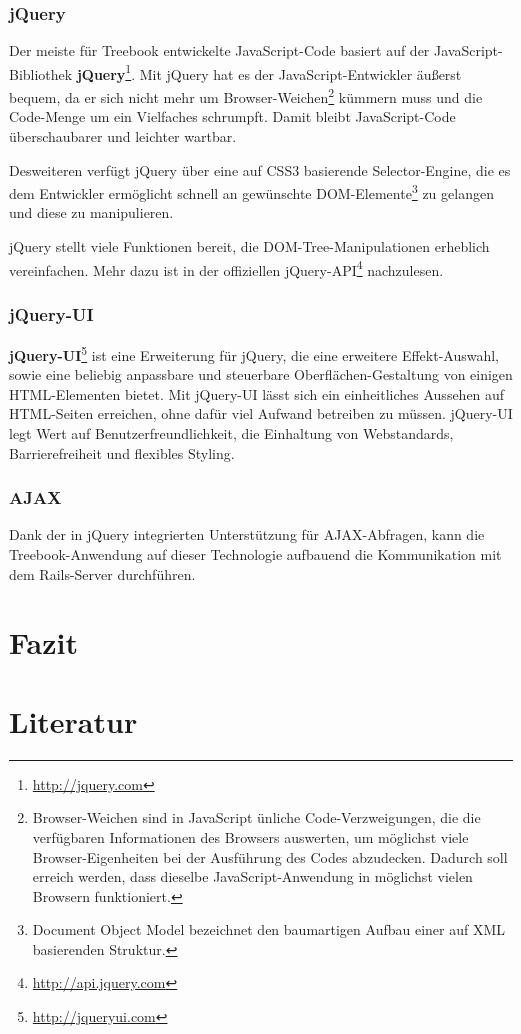 \documentclass[10pt,a4paper]{book}
\begin{document}
\subsection{jQuery}
Der meiste für Treebook entwickelte JavaScript-Code basiert auf der JavaScript-Bibliothek \textbf{jQuery}\footnote{\href{http://jquery.com}{http://jquery.com}}. Mit jQuery hat es der JavaScript-Entwickler äußerst bequem, da er sich nicht mehr um Browser-Weichen\footnote{Browser-Weichen sind in JavaScript ünliche Code-Verzweigungen, die die verfügbaren Informationen des Browsers auswerten, um möglichst viele Browser-Eigenheiten bei der Ausführung des Codes abzudecken. Dadurch soll erreich werden, dass dieselbe JavaScript-Anwendung in möglichst vielen Browsern funktioniert.} kümmern muss und die Code-Menge um ein Vielfaches schrumpft. Damit bleibt JavaScript-Code überschaubarer und leichter wartbar.

Desweiteren verfügt jQuery über eine auf CSS3 basierende Selector-Engine, die es dem Entwickler ermöglicht schnell an gewünschte DOM-Elemente\footnote{Document Object Model bezeichnet den baumartigen Aufbau einer auf XML basierenden Struktur.} zu gelangen und diese zu manipulieren.

jQuery stellt viele Funktionen bereit, die DOM-Tree-Manipulationen erheblich vereinfachen. Mehr dazu ist in der offiziellen jQuery-API\footnote{\href{http://api.jquery.com}{http://api.jquery.com}} nachzulesen.

\subsection{jQuery-UI}
\textbf{jQuery-UI}\footnote{\href{http://jqueryui.com}{http://jqueryui.com}} ist eine Erweiterung für jQuery, die eine erweitere Effekt-Auswahl, sowie eine beliebig anpassbare und steuerbare Oberflächen-Gestaltung von einigen HTML-Elementen bietet.
Mit jQuery-UI lässt sich ein einheitliches Aussehen auf HTML-Seiten erreichen, ohne dafür viel Aufwand betreiben zu müssen. jQuery-UI legt Wert auf Benutzerfreundlichkeit, die Einhaltung von Webstandards, Barrierefreiheit und flexibles Styling.

\subsection{AJAX}
Dank der in jQuery integrierten Unterstützung für AJAX-Abfragen, kann die Treebook-Anwendung auf dieser Technologie aufbauend die Kommunikation mit dem Rails-Server durchführen.
\chapter{Fazit}

\chapter{Literatur}
\end{document}
